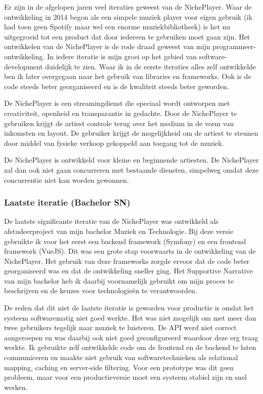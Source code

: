 Er zijn in de afgelopen jaren veel iteraties geweest van de NichePlayer. Waar de ontwikkeling in 2014 begon als een simpele muziek player voor eigen gebruik (ik had toen geen Spotify maar wel een enorme muziekbibliotheek) is het nu uitgegroeid tot een product dat door iedereen te gebruiken moet gaan zijn. Het ontwikkelen van de NichePlayer is de rode draad geweest van mijn programmeer-ontwikkeling. In iedere iteratie is mijn groei op het gebied van software-development duidelijk te zien. Waar ik in de eerste iteraties alles zelf ontwikkelde ben ik later overgegaan naar het gebruik van libraries en frameworks. Ook is de code steeds beter georganiseerd en is de kwaliteit steeds beter geworden.

De NichePlayer is een streamingdienst die speciaal wordt ontworpen met creativiteit, openheid en transparantie in gedachte. Door de NichePlayer te gebruiken krijgt de artiest controle terug over het medium in de vorm van inkomsten en layout. De gebruiker krijgt de mogelijkheid om de artiest te steunen door middel van fysieke verkoop gekoppeld aan toegang tot de muziek. 

De NichePlayer is ontwikkeld voor kleine en beginnende artiesten. De NichePlayer zal dan ook niet gaan concurreren met bestaande diensten, simpelweg omdat deze concurrentie niet kan worden gewonnen.

\subsubsection*{Laatste iteratie (Bachelor SN)}
De laatste significante iteratie van de NichePlayer was ontwikkeld als afstudeerproject van mijn bachelor Muziek en Technologie. Bij deze versie gebruikte ik voor het eerst een backend framework (Symfony) en een frontend framework (VueJS). Dit was een grote stap voorwaarts in de ontwikkeling van de NichePlayer. Het gebruik van deze frameworks zorgde ervoor dat de code beter georganiseerd was en dat de ontwikkeling sneller ging. Het Supportive Narrative van mijn bachelor heb ik daarbij voornamelijk gebruikt om mijn proces te beschrijven en de keuzes voor technologieën te verantwoorden.

De reden dat dit niet de laatste iteratie is geworden voor productie is omdat het systeem softwarematig niet goed werkte. Het was niet mogelijk om met meer dan twee gebruikers tegelijk naar muziek te luisteren. De API werd niet correct aangeroepen en was daarbij ook niet goed geconfigureerd waardoor deze erg traag werkte. Ik gebruikte zelf ontwikkelde code om de frontend en de backend te laten communiceren en maakte niet gebruik van softwaretechnieken als relational mapping, caching en server-side filtering. Voor een prototype was dit geen probleem, maar voor een productieversie moet een systeem stabiel zijn en snel werken.

